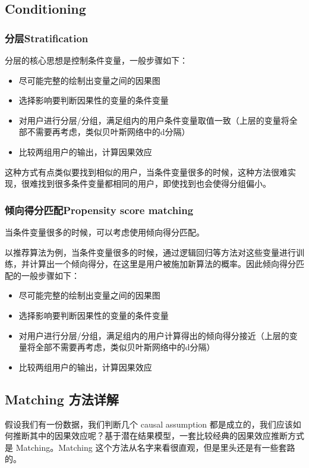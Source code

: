 \documentclass[12pt]{article}
\begin{document}
\subsection{Conditioning}
\subsubsection{分层Stratification}
分层的核心思想是控制条件变量，一般步骤如下：
\begin{itemize}
\setlength{\itemsep}{0pt}
\setlength{\parsep}{0pt}
\setlength{\parskip}{0pt}
    \item 尽可能完整的绘制出变量之间的因果图
    \item 选择影响要判断因果性的变量的条件变量
    \item 对用户进行分层/分组，满足组内的用户条件变量取值一致（上层的变量将全部不需要再考虑，类似贝叶斯网络中的d分隔）
    \item 比较两组用户的输出，计算因果效应
\end{itemize}
这种方式有点类似要找到相似的用户，当条件变量很多的时候，这种方法很难实现，很难找到很多条件变量都相同的用户，即使找到也会使得分组偏小。

\subsubsection{倾向得分匹配Propensity score matching}
当条件变量很多的时候，可以考虑使用倾向得分匹配。

以推荐算法为例，当条件变量很多的时候，通过逻辑回归等方法对这些变量进行训练，并计算出一个倾向得分，在这里是用户被施加新算法的概率。因此倾向得分匹配的一般步骤如下：
\begin{itemize}
\setlength{\itemsep}{0pt}
\setlength{\parsep}{0pt}
\setlength{\parskip}{0pt}
    \item 尽可能完整的绘制出变量之间的因果图
    \item 选择影响要判断因果性的变量的条件变量
    \item 对用户进行分层/分组，满足组内的用户计算得出的倾向得分接近（上层的变量将全部不需要再考虑，类似贝叶斯网络中的d分隔）
    \item 比较两组用户的输出，计算因果效应
\end{itemize}

\subsection{Matching 方法详解}
假设我们有一份数据，我们判断几个 causal assumption 都是成立的，我们应该如何推断其中的因果效应呢？基于潜在结果模型，一套比较经典的因果效应推断方式是 Matching。Matching 这个方法从名字来看很直观，但是里头还是有一些套路的。
\end{document}
